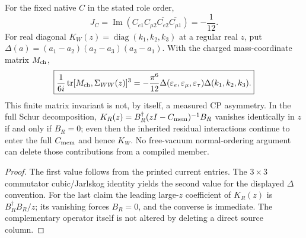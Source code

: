\documentclass[12pt,a4paper]{article}
\begin{document}
\begin{corollary}
\label{p5c:cor:v240-weak-return-cp-and-residual}
For the fixed native $C$ in the stated role order,
\[
 J_C=\operatorname{Im}
  (C_{e1}C_{\mu2}\overline{C_{e2}}\overline{C_{\mu1}})
 =-\frac1{12}.
\]
For real diagonal $K_W(z)=\operatorname{diag}(k_1,k_2,k_3)$ at a
regular real $z$, put
$\Delta(a)=(a_1-a_2)(a_2-a_3)(a_3-a_1)$. With the charged
mass-coordinate matrix $M_{\rm ch}$,
\[
 \boxed{\frac1{6i}\operatorname{tr}
    [M_{\rm ch},\Sigma_{WW}(z)]^3
     =-\frac{\pi^6}{12}\Delta(\varepsilon_e,\varepsilon_\mu,
         \varepsilon_\tau)\Delta(k_1,k_2,k_3).}
\]
This finite matrix invariant is not, by itself, a measured CP
asymmetry. In the full Schur decomposition,
$K_R(z)=B_R^\dagger(zI-C_{\rm mem})^{-1}B_R$ vanishes
identically in $z$ if and only if $B_R=0$; even then the inherited
residual interactions continue to enter the full $C_{\rm mem}$
and hence $K_W$. No free-vacuum normal-ordering argument can delete
those contributions from a compiled member.
\end{corollary}
\begin{proof}
The first value follows from the printed current entries.
The $3\times3$ commutator cubic/Jarlskog identity yields the
second value for the displayed $\Delta$ convention. For the last
claim the leading large-$z$ coefficient of $K_R(z)$ is
$B_R^\dagger B_R/z$; its vanishing forces $B_R=0$, and the
converse is immediate. The complementary operator itself is not
altered by deleting a direct source column.
\end{proof}
\end{document}
